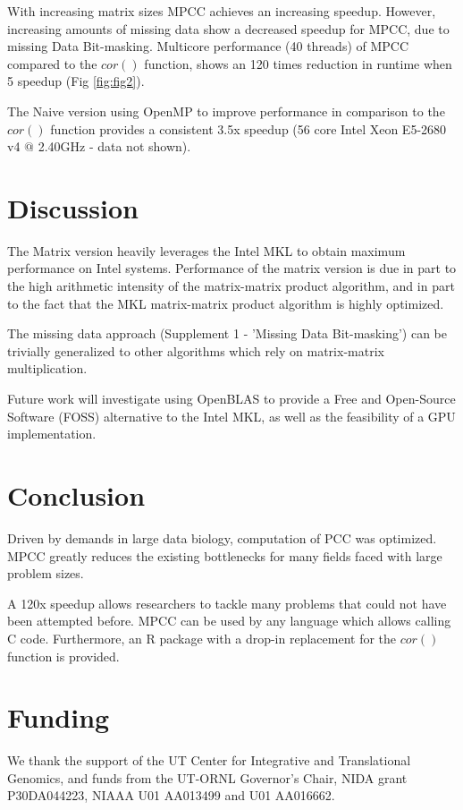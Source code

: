 \documentclass{bioinfo}
\begin{document}
With increasing matrix sizes  MPCC achieves an increasing speedup. However, 
increasing amounts of missing data show a decreased speedup for MPCC, due 
to missing Data Bit-masking. Multicore performance (40 threads) of MPCC 
compared to the $cor()$ function, shows an 120 times reduction in runtime 
when 5%
speedup (Fig \ref{fig:fig2}). 

The Naive version using OpenMP to improve performance in comparison to the 
$cor()$ function provides a consistent 3.5x speedup (56 core Intel Xeon E5-2680 
v4 $@$ 2.40GHz - data not shown).
\vspace*{-5mm}
\section{Discussion}
The Matrix version heavily leverages the Intel\textregistered{} MKL to obtain 
maximum performance on Intel\textregistered{} systems. Performance of the 
matrix version is due in part to the high arithmetic intensity of the 
matrix-matrix product algorithm, and in part to the fact that the MKL 
matrix-matrix product algorithm is highly optimized.  

The missing data approach (Supplement 1 - 'Missing Data Bit-masking') can be 
trivially generalized to other algorithms which rely on matrix-matrix multiplication.

Future work will investigate using OpenBLAS to provide a Free and Open-Source 
Software (FOSS) alternative to the Intel\textregistered{} MKL, as well as the 
feasibility of a GPU implementation.
\vspace*{-5mm}
\section{Conclusion}
Driven by demands in large data biology, computation of PCC was optimized. 
MPCC greatly reduces the existing bottlenecks for many fields faced with 
large problem sizes.

A 120x speedup allows researchers to tackle many problems that could 
not have been attempted before. MPCC can be used by any language which 
allows calling C code. Furthermore, an R package with a drop-in 
replacement for the $cor()$ function is provided.
\vspace*{-5mm}
\section*{Funding}
We thank the support of the UT Center for Integrative and Translational Genomics, 
and funds from the UT-ORNL Governor's Chair, NIDA grant P30DA044223, NIAAA U01 
AA013499 and U01 AA016662.
\vspace*{-5mm}


\end{document}
